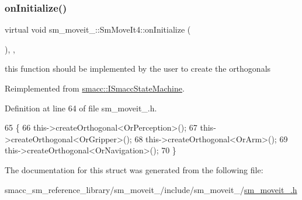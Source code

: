 \subsubsection{\texorpdfstring{on\+Initialize()}{onInitialize()}}
{\footnotesize\ttfamily virtual void sm\+\_\+moveit\+\_\+::\+Sm\+Move\+It4\+::on\+Initialize (\begin{DoxyParamCaption}{ }\end{DoxyParamCaption})\hspace{0.3cm}{\ttfamily [inline]}, {\ttfamily [override]}, {\ttfamily [virtual]}}



this function should be implemented by the user to create the orthogonals 



Reimplemented from \hyperlink{classsmacc_1_1ISmaccStateMachine_ac2982c6c8283663e5e1e8a7c82f511ec}{smacc\+::\+I\+Smacc\+State\+Machine}.



Definition at line 64 of file sm\+\_\+moveit\+\_.\+h.


\begin{DoxyCode}
65         \{
66             this->createOrthogonal<OrPerception>();
67             this->createOrthogonal<OrGripper>();
68             this->createOrthogonal<OrArm>();
69             this->createOrthogonal<OrNavigation>();
70         \}
\end{DoxyCode}


The documentation for this struct was generated from the following file\+:\begin{DoxyCompactItemize}
\item 
smacc\+\_\+sm\+\_\+reference\+\_\+library/sm\+\_\+moveit\+\_/include/sm\+\_\+moveit\+\_/\hyperlink{sm__moveit__4_8h}{sm\+\_\+moveit\+\_.\+h}\end{DoxyCompactItemize}
